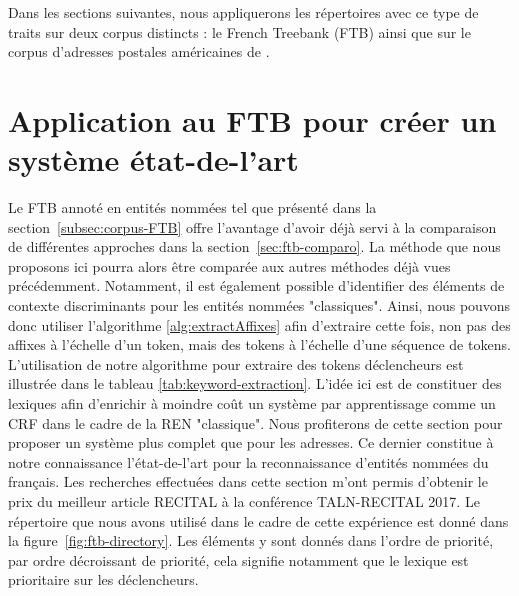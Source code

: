 \documentclass[12pt,a4paper,times,twoside,openright]{report}
\begin{document}
Dans les sections suivantes, nous appliquerons les répertoires avec ce type de traits sur deux corpus distincts : le French Treebank (FTB) ainsi que sur le corpus d'adresses postales américaines de \citet{yu2007high}.



    \section{Application au FTB pour créer un système état-de-l'art}
    \label{sec:taxonomy-ftb}
Le FTB annoté en entités nommées tel que présenté dans la section\ \ref{subsec:corpus-FTB} offre l'avantage d'avoir déjà servi à la comparaison de différentes approches dans la section\ \ref{sec:ftb-comparo}. La méthode que nous proposons ici pourra alors être comparée aux autres méthodes déjà vues précédemment. Notamment, il est également possible d'identifier des éléments de contexte discriminants pour les entités nommées "classiques". Ainsi, nous pouvons donc utiliser l'algorithme \ref{alg:extractAffixes} afin d'extraire cette fois, non pas des affixes à l'échelle d'un token, mais des tokens à l'échelle d'une séquence de tokens. L'utilisation de notre algorithme pour extraire des tokens déclencheurs est illustrée dans le tableau \ref{tab:keyword-extraction}. L'idée ici est de constituer des lexiques afin d'enrichir à moindre coût un système par apprentissage comme un CRF dans le cadre de la REN "classique". Nous profiterons de cette section pour proposer un système plus complet que pour les adresses. Ce dernier constitue à notre connaissance l'état-de-l'art pour la reconnaissance d'entités nommées du français. Les recherches effectuées dans cette section m'ont permis d'obtenir le prix du meilleur article RECITAL à la conférence TALN-RECITAL 2017. Le répertoire que nous avons utilisé dans le cadre de cette expérience est donné dans la figure\ \ref{fig:ftb-directory}. Les éléments y sont donnés dans l'ordre de priorité, par ordre décroissant de priorité, cela signifie notamment que le lexique est prioritaire sur les déclencheurs.
\end{document}
